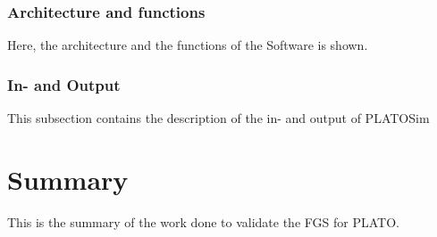\documentclass[11pt,a4paper]{report}
\begin{document}
		\subsection{Architecture and functions}
		Here, the architecture and the functions of the 					Software is shown.
		\subsection{In- and Output}
		This subsection contains the description of the in- 			and output of PLATOSim
\chapter{Summary}
This is the summary of the work done to validate the FGS for PLATO.
\end{document}
